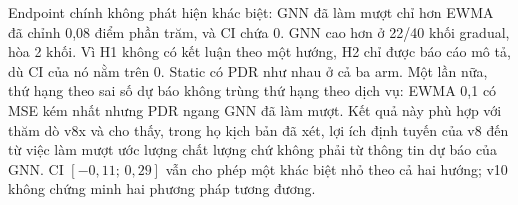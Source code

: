 Endpoint chính không phát hiện khác biệt: GNN đã làm mượt chỉ hơn EWMA đã chỉnh 0,08 điểm phần trăm, và CI chứa 0. GNN cao hơn ở 22/40 khối gradual, hòa 2 khối. Vì H1 không có kết luận theo một hướng, H2 chỉ được báo cáo mô tả, dù CI của nó nằm trên 0. Static có PDR như nhau ở cả ba arm. Một lần nữa, thứ hạng theo sai số dự báo không trùng thứ hạng theo dịch vụ: EWMA 0,1 có MSE kém nhất nhưng PDR ngang GNN đã làm mượt. Kết quả này phù hợp với thăm dò v8x và cho thấy, trong họ kịch bản đã xét, lợi ích định tuyến của v8 đến từ việc làm mượt ước lượng chất lượng chứ không phải từ thông tin dự báo của GNN. CI $[-0{,}11;\,0{,}29]$ vẫn cho phép một khác biệt nhỏ theo cả hai hướng; v10 không chứng minh hai phương pháp tương đương.
